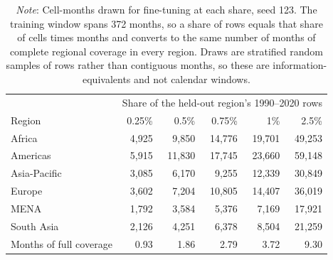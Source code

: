 \documentclass[11pt, letterpaper]{article}
\begin{document}
\begin{table}[!htbp]
\centering
\caption{Training Data at Each Share, in Cell-Months and in Months of Complete Regional Coverage}
\label{tab:share_months}
\small
\begin{tabular}{lrrrrr}
\hline
 & \multicolumn{5}{c}{Share of the held-out region's 1990--2020 rows} \\
Region & 0.25\% & 0.5\% & 0.75\% & 1\% & 2.5\% \\
\hline
Africa & 4,925 & 9,850 & 14,776 & 19,701 & 49,253 \\
Americas & 5,915 & 11,830 & 17,745 & 23,660 & 59,148 \\
Asia-Pacific & 3,085 & 6,170 & 9,255 & 12,339 & 30,849 \\
Europe & 3,602 & 7,204 & 10,805 & 14,407 & 36,019 \\
MENA & 1,792 & 3,584 & 5,376 & 7,169 & 17,921 \\
South Asia & 2,126 & 4,251 & 6,378 & 8,504 & 21,259 \\
\hline
Months of full coverage & 0.93 & 1.86 & 2.79 & 3.72 & 9.30 \\
\hline
\end{tabular}
\caption*{\footnotesize \textit{Note}: Cell-months drawn for fine-tuning at each share, seed 123. The training window spans 372 months, so a share of rows equals that share of cells times months and converts to the same number of months of complete regional coverage in every region. Draws are stratified random samples of rows rather than contiguous months, so these are information-equivalents and not calendar windows.}
\end{table}
\end{document}

